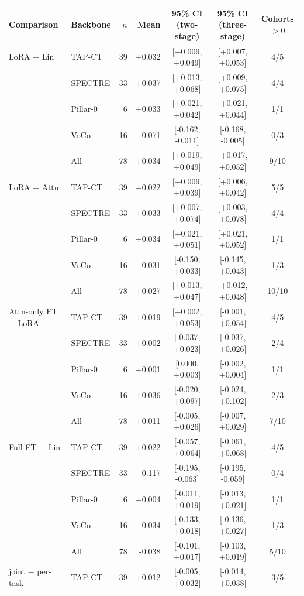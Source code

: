 \begin{tabular}{@{}llrrccc@{}}
\toprule
Comparison & Backbone & $n$ & Mean & 95\% CI (two-stage) & 95\% CI (three-stage) & Cohorts $>0$ \\
\midrule
LoRA $-$ Lin & TAP-CT & 39 & +0.032 & [+0.009, +0.049] & [+0.007, +0.053] & 4/5 \\
 & SPECTRE & 33 & +0.037 & [+0.013, +0.068] & [+0.009, +0.075] & 4/4 \\
 & Pillar-0 & 6 & +0.033 & [+0.021, +0.042] & [+0.021, +0.044] & 1/1 \\
 & VoCo & 16 & -0.071 & [-0.162, -0.011] & [-0.168, -0.005] & 0/3 \\
 & All & 78 & +0.034 & [+0.019, +0.049] & [+0.017, +0.052] & 9/10 \\
\addlinespace[2pt]
LoRA $-$ Attn & TAP-CT & 39 & +0.022 & [+0.009, +0.039] & [+0.006, +0.042] & 5/5 \\
 & SPECTRE & 33 & +0.033 & [+0.007, +0.074] & [+0.003, +0.078] & 4/4 \\
 & Pillar-0 & 6 & +0.034 & [+0.021, +0.051] & [+0.021, +0.052] & 1/1 \\
 & VoCo & 16 & -0.031 & [-0.150, +0.033] & [-0.145, +0.043] & 1/3 \\
 & All & 78 & +0.027 & [+0.013, +0.047] & [+0.012, +0.048] & 10/10 \\
\addlinespace[2pt]
Attn-only FT $-$ LoRA & TAP-CT & 39 & +0.019 & [+0.002, +0.053] & [-0.001, +0.054] & 4/5 \\
 & SPECTRE & 33 & +0.002 & [-0.037, +0.023] & [-0.037, +0.026] & 2/4 \\
 & Pillar-0 & 6 & +0.001 & [0.000, +0.003] & [-0.002, +0.004] & 1/1 \\
 & VoCo & 16 & +0.036 & [-0.020, +0.097] & [-0.024, +0.102] & 2/3 \\
 & All & 78 & +0.011 & [-0.005, +0.026] & [-0.007, +0.029] & 7/10 \\
\addlinespace[2pt]
Full FT $-$ Lin & TAP-CT & 39 & +0.022 & [-0.057, +0.064] & [-0.061, +0.068] & 4/5 \\
 & SPECTRE & 33 & -0.117 & [-0.195, -0.063] & [-0.195, -0.059] & 0/4 \\
 & Pillar-0 & 6 & +0.004 & [-0.011, +0.019] & [-0.013, +0.021] & 1/1 \\
 & VoCo & 16 & -0.034 & [-0.133, +0.018] & [-0.136, +0.027] & 1/3 \\
 & All & 78 & -0.038 & [-0.101, +0.017] & [-0.103, +0.019] & 5/10 \\
\addlinespace[2pt]
joint $-$ per-task & TAP-CT & 39 & +0.012 & [-0.005, +0.032] & [-0.014, +0.038] & 3/5 \\

\end{tabular}
